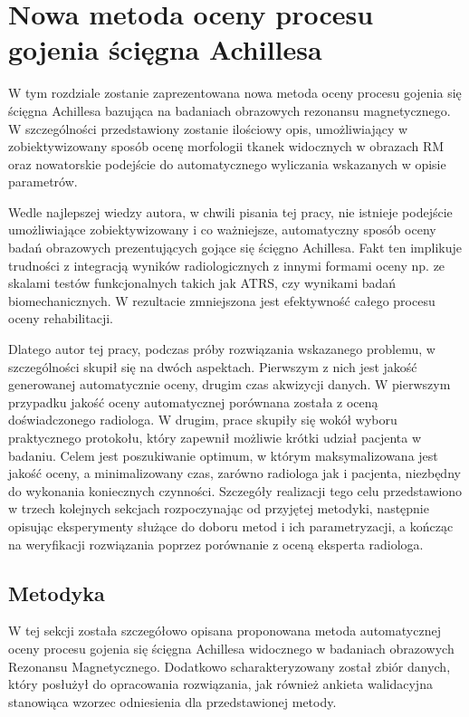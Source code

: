\chapter{Nowa metoda oceny procesu gojenia ścięgna Achillesa}
\label{NewMethod}

W tym rozdziale zostanie zaprezentowana nowa metoda oceny procesu gojenia się ścięgna Achillesa bazująca na badaniach obrazowych rezonansu magnetycznego. W szczególności przedstawiony zostanie ilościowy opis, umożliwiający w zobiektywizowany sposób ocenę morfologii tkanek widocznych w obrazach RM oraz nowatorskie podejście do automatycznego wyliczania wskazanych w opisie parametrów. 

Wedle najlepszej wiedzy autora, w chwili pisania tej pracy, nie istnieje podejście umożliwiające zobiektywizowany i co ważniejsze, automatyczny sposób oceny badań obrazowych prezentujących gojące się ścięgno Achillesa. Fakt ten implikuje trudności z integracją wyników radiologicznych z innymi formami oceny np. ze skalami testów funkcjonalnych takich jak ATRS, czy wynikami badań biomechanicznych. W rezultacie zmniejszona jest efektywność całego procesu oceny rehabilitacji. 

Dlatego autor tej pracy, podczas próby rozwiązania wskazanego problemu, w szczególności skupił się na dwóch aspektach. Pierwszym z nich jest jakość generowanej automatycznie oceny, drugim czas akwizycji danych. W pierwszym przypadku jakość oceny automatycznej porównana została z oceną doświadczonego radiologa. W drugim, prace skupiły się wokół wyboru praktycznego protokołu, który zapewnił możliwie krótki udział pacjenta w badaniu. Celem jest poszukiwanie optimum, w którym maksymalizowana jest jakość oceny, a minimalizowany czas, zarówno radiologa jak i pacjenta, niezbędny do wykonania koniecznych czynności. Szczegóły realizacji tego celu przedstawiono w trzech kolejnych sekcjach rozpoczynając od przyjętej metodyki, następnie opisując eksperymenty służące do doboru metod i ich parametryzacji, a kończąc na weryfikacji rozwiązania poprzez porównanie z oceną eksperta radiologa.

\section{Metodyka}
\label{seq:method}
W tej sekcji została szczegółowo opisana proponowana metoda automatycznej oceny procesu gojenia się ścięgna Achillesa widocznego w badaniach obrazowych Rezonansu Magnetycznego. Dodatkowo scharakteryzowany został zbiór danych, który posłużył do opracowania rozwiązania, jak również ankieta walidacyjna stanowiąca wzorzec odniesienia dla przedstawionej metody. 


